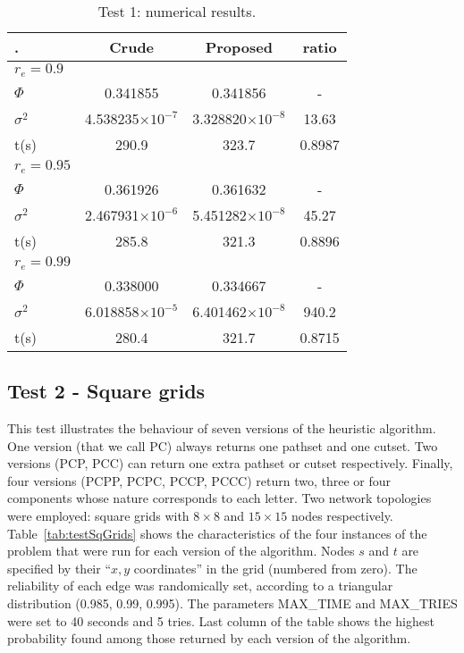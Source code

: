 \documentclass[a4paper]{article}
\begin{document}
\begin{table}
\begin{center} \small
\begin{tabular}{ | l | c | c | c | }
\hline
. & Crude &  Proposed &  ratio \\ \hline \hline
$r_e=0.9$ \\ \hline \hline
\quad $\Phi$ &  0.341855  &  0.341856  &  - \\ \hline
\quad $\sigma^2$ & 4.538235$\times 10^{-7}$ & 3.328820$\times 10^{-8}$ & 13.63 \\ \hline
\quad t(s) & 290.9 &  323.7  & 0.8987 \\ \hline
$r_e=0.95$ \\ \hline \hline
\quad $\Phi$ &  0.361926  &  0.361632  &  - \\ \hline
\quad $\sigma^2$ & 2.467931$\times 10^{-6}$ & 5.451282$\times 10^{-8}$ & 45.27 \\ \hline
\quad t(s) & 285.8 &  321.3  & 0.8896 \\ \hline
$r_e=0.99$ \\ \hline \hline
\quad $\Phi$ &  0.338000  &  0.334667  &  - \\ \hline
\quad $\sigma^2$ & 6.018858$\times 10^{-5}$ & 6.401462$\times 10^{-8}$ & 940.2 \\ \hline
\quad t(s) & 280.4 &  321.7  & 0.8715 \\ \hline
\end{tabular}
\end{center}
\caption{Test 1: numerical results.}
\label{tab:results-case-1}
\end{table}








\subsection{Test 2 - Square grids} \label{ss:squaregrids}

This test illustrates the behaviour of seven versions of the heuristic algorithm. One version (that we call PC) always returns one pathset and one cutset. Two versions (PCP, PCC) can return one extra pathset or cutset respectively. Finally, four versions (PCPP, PCPC, PCCP, PCCC) return two, three or four components whose nature corresponds to each letter. Two network topologies were employed: square grids with $8\times 8$ and $15\times 15$ nodes respectively. Table~\ref{tab:testSqGrids} shows the characteristics of the four instances of the problem that were run for each version of the algorithm. Nodes $s$ and $t$ are specified by their ``$x,y$ coordinates'' in the grid (numbered from zero). The reliability of each edge was randomically set, according to a triangular distribution (0.985, 0.99, 0.995). The parameters MAX\_TIME and MAX\_TRIES were set to 40 seconds and 5 tries. Last column of the table shows the highest probability found among those returned by each version of the algorithm. 
\end{document}
